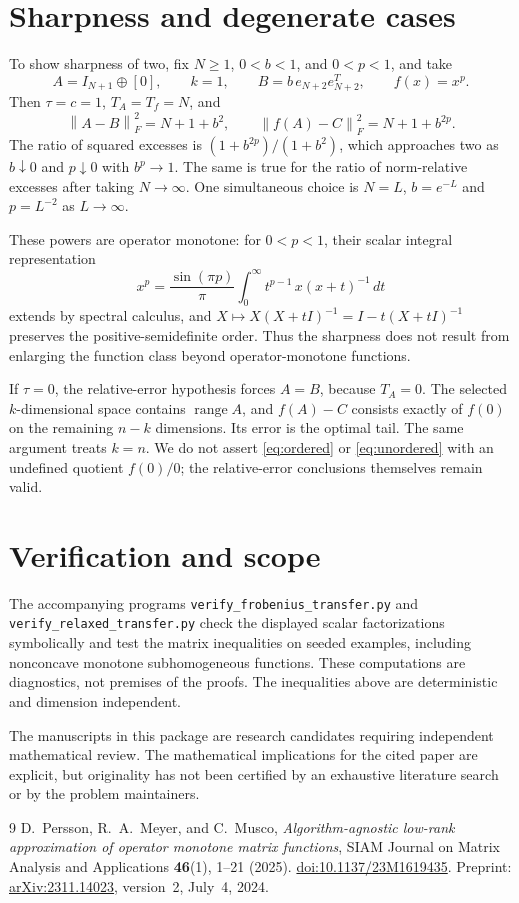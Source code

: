 \documentclass[11pt]{article}
\theoremstyle{definition}
\newcommand{\range}{\operatorname{range}}
\newcommand{\norm}[1]{\left\lVert#1\right\rVert}
\newcommand{\TA}{T_A}
\newcommand{\Tf}{T_f}
\begin{document}
\section{Sharpness and degenerate cases}
To show sharpness of two, fix $N\ge1$, $0<b<1$, and $0<p<1$, and take
\[
 A=I_{N+1}\oplus[0],\qquad k=1,\qquad
 B=b\,e_{N+2}e_{N+2}^T,\qquad f(x)=x^p.
\]
Then $\tau=c=1$, $\TA=\Tf=N$, and
\[
 \norm{A-B}_F^2=N+1+b^2,\qquad
 \norm{f(A)-C}_F^2=N+1+b^{2p}.
\]
The ratio of squared excesses is $(1+b^{2p})/(1+b^2)$, which approaches two as $b\downarrow0$ and $p\downarrow0$ with $b^p\to1$. The same is true for the ratio of norm-relative excesses after taking $N\to\infty$. One simultaneous choice is $N=L$, $b=e^{-L}$ and $p=L^{-2}$ as $L\to\infty$.

These powers are operator monotone: for $0<p<1$, their scalar integral representation
\[
 x^p=\frac{\sin(\pi p)}\pi
       \int_0^\infty t^{p-1}\,x(x+t)^{-1}\,dt
\]
extends by spectral calculus, and $X\mapsto X(X+tI)^{-1}=I-t(X+tI)^{-1}$ preserves the positive-semidefinite order. Thus the sharpness does not result from enlarging the function class beyond operator-monotone functions.

If $\tau=0$, the relative-error hypothesis forces $A=B$, because $\TA=0$. The selected $k$-dimensional space contains $\range A$, and $f(A)-C$ consists exactly of $f(0)$ on the remaining $n-k$ dimensions. Its error is the optimal tail. The same argument treats $k=n$. We do not assert \eqref{eq:ordered} or \eqref{eq:unordered} with an undefined quotient $f(0)/0$; the relative-error conclusions themselves remain valid.

\section{Verification and scope}
The accompanying programs \texttt{verify\_frobenius\_transfer.py} and \texttt{verify\_relaxed\_transfer.py} check the displayed scalar factorizations symbolically and test the matrix inequalities on seeded examples, including nonconcave monotone subhomogeneous functions. These computations are diagnostics, not premises of the proofs. The inequalities above are deterministic and dimension independent.

The manuscripts in this package are research candidates requiring independent mathematical review. The mathematical implications for the cited paper are explicit, but originality has not been certified by an exhaustive literature search or by the problem maintainers.

\begin{thebibliography}{9}
D.~Persson, R.~A.~Meyer, and C.~Musco,
\emph{Algorithm-agnostic low-rank approximation of operator monotone matrix functions},
SIAM Journal on Matrix Analysis and Applications \textbf{46}(1), 1--21 (2025).
\href{https://doi.org/10.1137/23M1619435}{doi:10.1137/23M1619435}.
Preprint: \href{https://arxiv.org/abs/2311.14023}{arXiv:2311.14023}, version~2, July~4, 2024.
\end{thebibliography}
\end{document}
